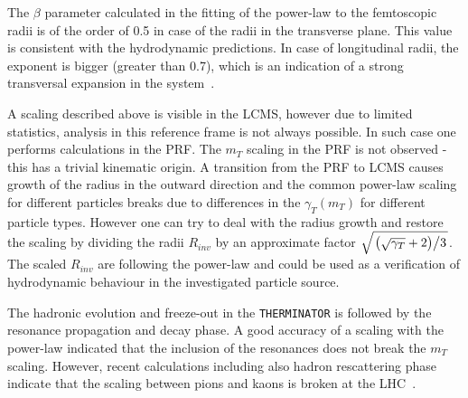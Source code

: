     The $\beta$ parameter calculated in the fitting of the power-law to the femtoscopic radii is of the order of 0.5 in case of the radii in the transverse plane.
    This value is consistent with the hydrodynamic predictions.
    In case of longitudinal radii, the exponent is bigger (greater than 0.7), which is an indication of a strong transversal expansion in the system~\cite{akkelin_sinyukov}.

    A scaling described above is visible in the LCMS, however due to limited statistics, analysis in this reference frame is not always possible.
    In such case one performs calculations in the PRF.
    The $m_T$ scaling in the PRF is not observed - this has a trivial kinematic origin.
    A transition from the PRF to LCMS causes growth of the radius in the outward direction and the common power-law scaling for different particles breaks due to differences in the $\gamma_T (m_T)$ for different particle types.
    However one can try to deal with the radius growth and restore the scaling by dividing the radii $R_{inv}$ by an approximate factor $\sqrt{ \left. \left( \sqrt{\gamma_T} + 2 \right) \middle/ 3 \right. }$.
    The scaled $R_{inv}$ are following the power-law and could be used as a verification of hydrodynamic behaviour in the investigated particle source.

    The hadronic evolution and freeze-out in the \verb|THERMINATOR| is followed by the resonance propagation and decay phase.
    A good accuracy of a scaling with the power-law indicated that the inclusion of the resonances does not break the $m_T$ scaling.
    However, recent calculations including also hadron rescattering phase indicate that the scaling between pions and kaons is broken at the LHC~\cite{sinyukov_kaon}.
